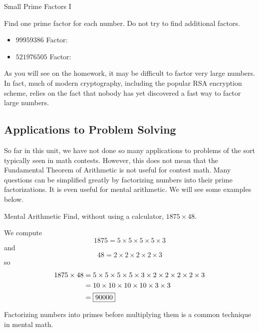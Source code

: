 \documentclass[a4paper,10pt]{report}
\begin{document}
\begin{problem}{Small Prime Factors I}

 Find one prime factor for each number. Do not try to find additional factors.

 \begin{itemize}
  \item \(99959386\) \hfill Factor: 
  \item \(521976505\) \hfill Factor: 
 \end{itemize}

\end{problem}

As you will see on the homework, it may be difficult to factor very large
numbers. In fact, much of modern cryptography, including the popular RSA
encryption scheme, relies on the fact that nobody has yet discovered a fast way
to factor large numbers.

\subsection{Applications to Problem Solving}

So far in this unit, we have not done so many applications to problems of the
sort typically seen in math contests. However, this does not mean that the
Fundamental Theorem of Arithmetic is not useful for contest math. Many
questions can be simplified greatly by factorizing numbers into their prime
factorizations. It is even useful for mental arithmetic. We will see some
examples below.

\begin{problem}{Mental Arithmetic}
 Find, without using a calculator, \(1875\times48\).

 \begin{solution}
  We compute \[
   1875 = 5 \times 5 \times 5 \times 5 \times 3
  \] and \[
   48 = 2 \times 2 \times 2 \times 2 \times 3
  \] so \begin{align*}
   1875 \times 48
   &= 5 \times 5 \times 5 \times 5 \times 3 \times 2 \times 2 \times 2 \times 2
   \times 3 \\
   &= 10 \times 10 \times 10 \times 10 \times 3 \times 3 \\
   &= \Ans{90000}
  \end{align*}

  Factorizing numbers into primes before multiplying them is a common technique
  in mental math.
 \end{solution}
\end{problem}
\end{document}
